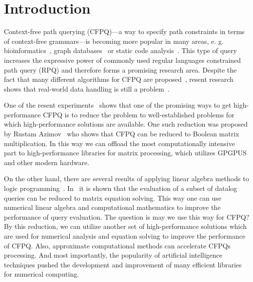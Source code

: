 \documentclass[sigconf]{acmart}
\begin{document}



\maketitle

\section{Introduction}

Context-free path querying (CFPQ)---a way to specify path constraints in terms of context-free grammars---is becoming more popular in many areas, e. g. bioinformatics~\cite{sevon2008subgraph}, graph databases~\cite{yannakakis1990graph,Medeiros:2018:EEC:3167132.3167265,Kuijpers:2019:ESC:3335783.3335791} or static code analysis~\cite{Reps,zhang2013fast}. 
This type of query increases the expressive power of commonly used regular languages constrained path query (RPQ) and therefore forms a promising research area.
Despite the fact that many different algorithms for CFPQ are proposed~\cite{RDF,Medeiros:2018:EEC:3167132.3167265,azimov2018context,Verbitskaia:2018:PCC:3241653.3241655,10.1007/978-3-319-91662-0_17}, resent research shows that real-world data handling is still a problem~\cite{Kuijpers:2019:ESC:3335783.3335791}.

One of the resent experiments~\cite{mishin2019evaluation} shows that one of the promising ways to get high-performance CFPQ is to reduce the problem to well-established problems for which high-performance solutions are available.
One such reduction was proposed by Rustam Azimov~\cite{azimov2018context} who shows that CFPQ can be reduced to Boolean matrix multiplication.
In this way we can offload the most computationally intensive part to high-performance libraries for matrix processing, which utilizes GPGPUS and other modern hardware.

On the other hand, there are several results of applying linear algebra methods to logic programming~\cite{sato2017linear, aspis2018linear}. 
In~\cite{sato2017linear} it is shown that the evaluation of a subset of datalog queries can be reduced to matrix equation solving.  
This way one can use numerical linear algebra and computational mathematics to improve the performance of query evaluation.
The question is may we use this way for CFPQ?
By this reduction, we can utilize another set of high-performance solutions which are used for numerical analysis and equation solving to improve the performance of CFPQ.
Also, approximate computational methods can accelerate CFPQs processing.
And most importantly, the popularity of artificial intelligence techniques pushed the development and improvement of many efficient libraries for numerical computing.
\end{document}
